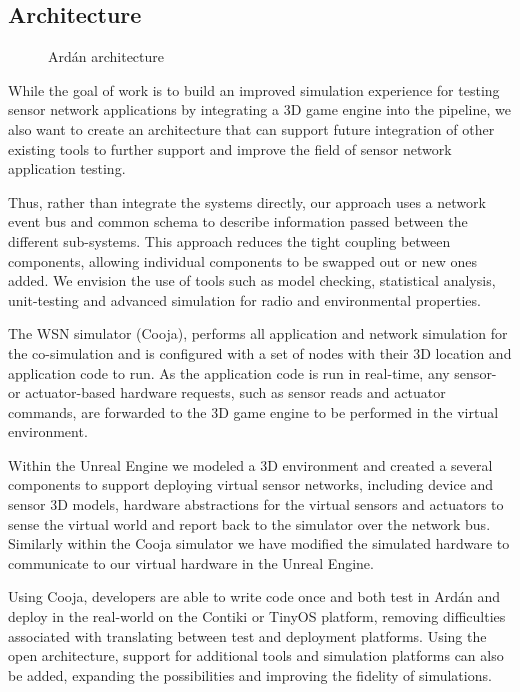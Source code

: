 \subsection{Architecture} %
\label{sub:architecture}

\begin{figure}[ht]
  
  \caption{Ard\'{a}n architecture}
  \label{fig:architecture}
\end{figure}

While the goal of work is to build an improved simulation experience for testing sensor network applications by integrating a 3D game engine into the pipeline, we also want to create an architecture that can support future integration of other existing tools to further support and improve the field of sensor network application testing.

Thus, rather than integrate the systems directly, our approach uses a network event bus and common schema to describe information passed between the different sub-systems. This approach reduces the tight coupling between components, allowing individual components to be swapped out or new ones added. We envision the use of tools such as model checking, statistical analysis, unit-testing and advanced simulation for radio and environmental properties.

The WSN simulator (Cooja), performs all application and network simulation for the co-simulation and is configured with a set of nodes with their 3D location and application code to run. As the application code is run in real-time, any sensor- or actuator-based hardware requests, such as sensor reads and actuator commands, are forwarded to the 3D game engine to be performed in the virtual environment.

Within the Unreal Engine we modeled a 3D environment and created a several components to support deploying virtual sensor networks, including device and sensor 3D models, hardware abstractions for the virtual sensors and actuators to sense the virtual world and report back to the simulator over the network bus. Similarly within the Cooja simulator we have modified the simulated hardware to communicate to our virtual hardware in the Unreal Engine.

Using Cooja, developers are able to write code once and both test in Ard\'{a}n and deploy in the real-world on the Contiki or TinyOS platform, removing difficulties associated with translating between test and deployment platforms. Using the open architecture, support for additional tools and simulation platforms can also be added, expanding the possibilities and improving the fidelity of simulations.


